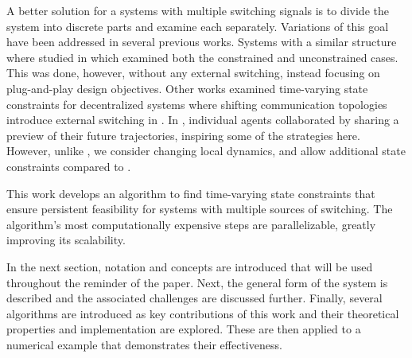A better solution for a systems with multiple switching signals is to divide the system into discrete parts and examine each separately. Variations of this goal have been addressed in several previous works. Systems with a similar structure where studied in \cite{Riverso2015} which examined both the constrained and unconstrained cases. This was done, however, without any external switching, instead focusing on plug-and-play design objectives. Other works examined time-varying state constraints for decentralized systems where shifting communication topologies introduce external switching in \cite{Ahandani2020, Li2020}. In \cite{Li2020}, individual agents collaborated by sharing a preview of their future trajectories, inspiring some of the strategies here. However, unlike \cite{Ahandani2020, Li2020}, we consider changing local dynamics, and allow additional state constraints compared to \cite{Li2020}.


This work develops an algorithm to find time-varying state constraints that ensure persistent feasibility for systems with multiple sources of switching. The algorithm's most computationally expensive steps are parallelizable, greatly improving its scalability. 

In the next section, notation and concepts are introduced that will be used throughout the reminder of the paper. Next, the general form of the system is described and the associated challenges are discussed further. Finally, several algorithms are introduced as key contributions of this work and their theoretical properties and implementation are explored. These are then applied to a numerical example that demonstrates their effectiveness. 